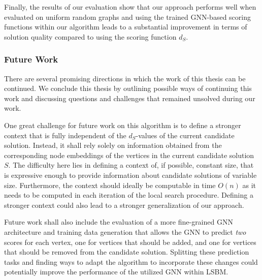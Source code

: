 \documentclass[draft,final]{vutinfth} %
\begin{document}
Finally, the results of our evaluation show that our approach performs well when evaluated on uniform random graphs and using the trained GNN-based scoring functions within our algorithm leads to a substantial improvement in terms of solution quality compared to using the scoring function $d_S$. 



\subsubsection{Future Work}

There are several promising directions in which the work of this thesis can be continued. We conclude this thesis by outlining possible ways of continuing this work and discussing questions and challenges that remained unsolved during our work. 

One great challenge for future work on this algorithm is to define a stronger context that is fully independent of the $d_S$-values of the current candidate solution. Instead, it shall rely solely on information obtained from the corresponding node embeddings of the vertices in the current candidate solution $S$. The difficulty here lies in defining a context of, if possible, constant size, that is expressive enough to provide information about candidate solutions of variable size. Furthermore, the context should ideally be computable in time $O(n)$ as it needs to be computed in each iteration of the local search procedure. 
Defining a stronger context could also lead to a stronger generalization of our approach. 

Future work shall also include the evaluation of a more fine-grained GNN architecture and training data generation that allows the GNN to predict \emph{two} scores for each vertex, one for vertices that should be added, and one for vertices that should be removed from the candidate solution. 
Splitting these prediction tasks and finding ways to adapt the algorithm to incorporate these changes could potentially improve the performance of the utilized GNN within LSBM. 
\end{document}
